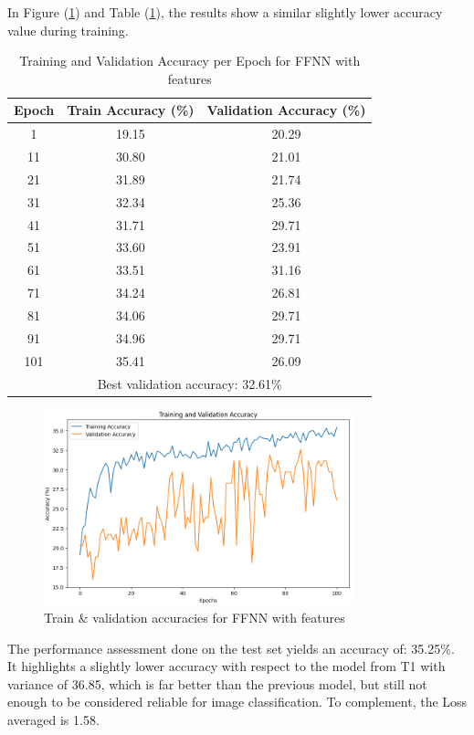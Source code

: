 \documentclass[11pt]{scrartcl}
\begin{document}
In Figure (\ref{fig:task1-bonus-accuracy}) 
and Table (\ref{tab:task1-bonus-accuracy}), 
the results show a similar slightly lower accuracy value during training.

\begin{table}[htbp]
\centering
\caption{Training and Validation Accuracy per Epoch for FFNN with features}
\begin{tabular}{ccc}
\toprule
\textbf{Epoch} & \textbf{Train Accuracy (\%)} & \textbf{Validation Accuracy (\%)} \\
\midrule
1    & 19.15  & 20.29  \\
11   & 30.80  & 21.01  \\
21   & 31.89  & 21.74  \\
31   & 32.34  & 25.36  \\
41   & 31.71  & 29.71  \\
51   & 33.60  & 23.91  \\
61   & 33.51  & 31.16  \\
71   & 34.24  & 26.81  \\
81   & 34.06  & 29.71  \\
91   & 34.96  & 29.71  \\
101  & 35.41  & 26.09  \\
\midrule
\multicolumn{3}{c}{Best validation accuracy: 32.61\%} \\
\bottomrule
\end{tabular}
\label{tab:task1-bonus-accuracy}
\end{table}

\begin{figure}[htbp]
\centering
\includegraphics[width=0.8\textwidth]{./figures/task1-bonus-accuracy.png}
\caption{Train \& validation accuracies for FFNN with features}
\label{fig:task1-bonus-accuracy}
\end{figure}

The performance assessment done on the test set 
yields an accuracy of: 35.25\%.
It highlights a slightly lower accuracy 
with respect to the model from T1 with variance of 36.85,
which is far better than the previous model,
but still not enough to be considered reliable for image classification.
To complement, the Loss averaged is 1.58.
\end{document}
